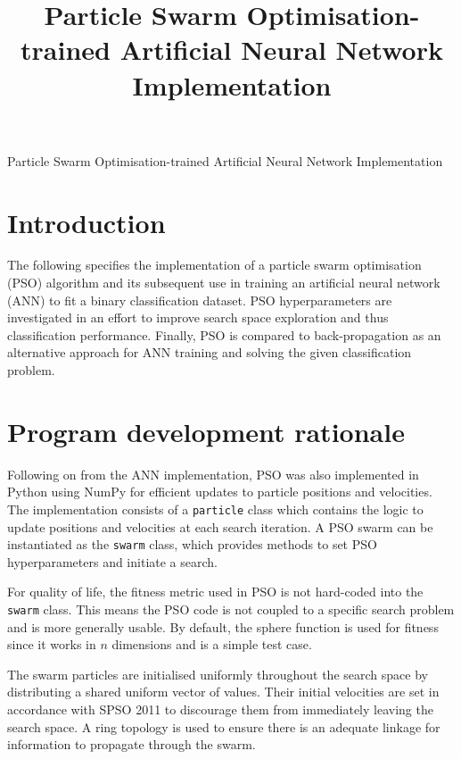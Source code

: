 \documentclass[12pt]{article}
\begin{document}
\title{Particle Swarm Optimisation-trained Artificial Neural Network Implementation}

\begin{center}
  \Large{Particle Swarm Optimisation-trained Artificial Neural Network Implementation}
\end{center}

\vspace{-2em}
\section{Introduction}
\vspace{-1.5em}

The following specifies the implementation of a particle swarm
optimisation (PSO) algorithm and its subsequent use in training an
artificial neural network (ANN) to fit a binary classification dataset.
PSO hyperparameters are investigated in an effort to improve search
space exploration and thus classification performance. Finally, PSO is
compared to back-propagation as an alternative approach for ANN training
and solving the given classification problem.

\vspace{-1.5em}
\section{Program development rationale}
\vspace{-1.5em}

Following on from the ANN implementation, PSO was also implemented in
Python using NumPy for efficient updates to particle positions and velocities.
The implementation consists of a \texttt{particle} class which contains
the logic to update positions and velocities at each search iteration.
A PSO swarm can be instantiated as the \texttt{swarm} class, which provides
methods to set PSO hyperparameters and initiate a search.

For quality of life, the fitness metric used in PSO is not hard-coded
into the \texttt{swarm} class. This means the PSO code is not coupled to
a specific search problem and is more generally usable. By default, the
sphere function is used for fitness since it works in \(n\) dimensions
and is a simple test case.

The swarm particles are initialised uniformly throughout the search space
by distributing a shared uniform vector of values. Their initial velocities
are set in accordance with SPSO 2011 \cite{Clerc} to discourage them from
immediately leaving the search space. A ring topology \cite{Clerc} is used to
ensure there is an adequate linkage for information to propagate through
the swarm.
\end{document}
